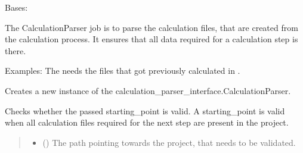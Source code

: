 \documentclass[letterpaper,10pt,english]{sphinxmanual}
\begin{document}
\begin{fulllineitems}
\label{\detokenize{apidoc/src.osm_configurator.model.parser:src.osm_configurator.model.parser.calculation_parser.CalculationParser}}
\pysigstartsignatures
{}
\pysigstopsignatures
\sphinxAtStartPar
Bases: {\hyperref[\detokenize{apidoc/src.osm_configurator.model.parser:src.osm_configurator.model.parser.calculation_parser_interface.CalculationParserInterface}]{}}

\sphinxAtStartPar
The CalculationParser job is to parse the calculation files, that are created from the calculation process.
It ensures that all data required for a calculation step is there.

\sphinxAtStartPar
Examples: The  needs the
files that got previously calculated in .

\begin{fulllineitems}
\label{\detokenize{apidoc/src.osm_configurator.model.parser:src.osm_configurator.model.parser.calculation_parser.CalculationParser.__init__}}
\pysigstartsignatures
{}
\pysigstopsignatures
\sphinxAtStartPar
Creates a new instance of the calculation\_parser\_interface.CalculationParser.

\end{fulllineitems}


\begin{fulllineitems}
\label{\detokenize{apidoc/src.osm_configurator.model.parser:src.osm_configurator.model.parser.calculation_parser.CalculationParser.check_validity_of_calculation_step}}
\pysigstartsignatures
{}
\pysigstopsignatures
\sphinxAtStartPar
Checks whether the passed starting\_point is valid.
A starting\_point is valid when all calculation files required for the next step are present in the project.
\begin{quote}\begin{description}
\begin{itemize}
\item {} 
\sphinxAtStartPar
{} () \textendash{} The path pointing towards the project, that needs to be validated.


\end{itemize}
\end{description}
\end{quote}
\end{fulllineitems}
\end{fulllineitems}
\end{document}
